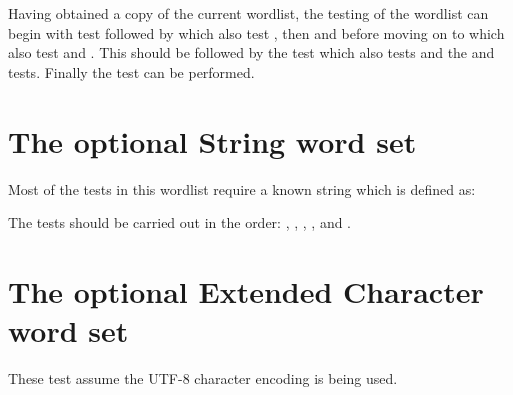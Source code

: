 Having obtained a copy of the current wordlist, the testing of the
wordlist can begin with test  followed
by  which also test , then
\linebreak
{} and  before moving on to
 which also test  and
.  This should be followed by the test
\linebreak
{} which also tests  and the
 and  tests.
Finally the  test can be performed.



\section{The optional String word set} %

Most of the tests in this wordlist require a known string which is
defined as:


The tests should be carried out in the order:
,
, \linebreak
{},
,
 and \linebreak
{}.



\section{The optional Extended Character word set} %

These test assume the UTF-8 character encoding is being used.





\endinput %

